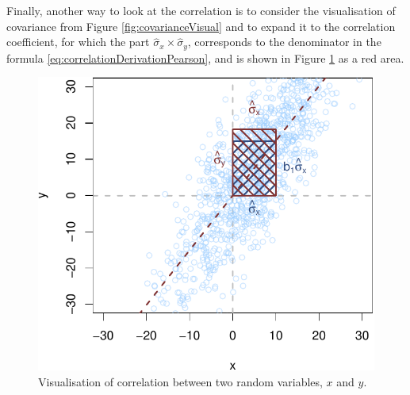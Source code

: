 \documentclass[
]{book}
\theoremstyle{definition}
\theoremstyle{definition}
\theoremstyle{definition}
\theoremstyle{definition}
\theoremstyle{remark}
\begin{document}
Finally, another way to look at the correlation is to consider the visualisation of covariance from Figure \ref{fig:covarianceVisual} and to expand it to the correlation coefficient, for which the part \(\hat{\sigma}_x \times \hat{\sigma}_y\), corresponds to the denominator in the formula \eqref{eq:correlationDerivationPearson}, and is shown in Figure \ref{fig:correlationVisual2} as a red area.

\begin{figure}
\centering
\includegraphics{Svetunkov---Statistics-for-Business-Analytics_files/figure-latex/correlationVisual2-1.pdf}
\caption{\label{fig:correlationVisual2}Visualisation of correlation between two random variables, \(x\) and \(y\).}
\end{figure}
\end{document}
